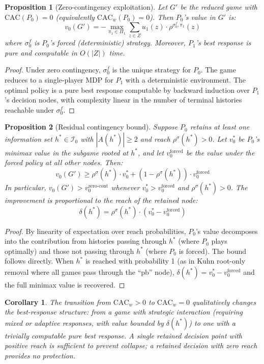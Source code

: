 \documentclass{article}
\newtheorem{proposition}{Proposition}
\newtheorem{corollary}{Corollary}
\begin{document}
\begin{proposition}[Zero-contingency exploitation]
\label{prop:zero}
Let $G'$ be the reduced game with $\text{CAC}(P_0) = 0$ (equivalently $\text{CAC}_w(P_0) = 0$). Then $P_0$'s value in $G'$ is:
\[
v_0(G') = -\max_{\pi_1 \in \Pi_1} \sum_{z \in Z} u_1(z) \cdot \rho^{\sigma_0^f, \pi_1}(z)
\]
where $\sigma_0^f$ is $P_0$'s forced (deterministic) strategy. Moreover, $P_1$'s best response is pure and computable in $O(|Z|)$ time.
\end{proposition}

\begin{proof}
Under zero contingency, $\sigma_0^f$ is the unique strategy for $P_0$. The game reduces to a single-player MDP for $P_1$ with a deterministic environment. The optimal policy is a pure best response computable by backward induction over $P_1$'s decision nodes, with complexity linear in the number of terminal histories reachable under $\sigma_0^f$.
\end{proof}

\begin{proposition}[Residual contingency bound]
\label{prop:residual}
Suppose $P_0$ retains at least one information set $h^* \in \mathcal{I}_0$ with $|A(h^*)| \geq 2$ and reach $\rho^{\sigma}(h^*) > 0$. Let $v_0^*$ be $P_0$'s minimax value in the subgame rooted at $h^*$, and let $v_0^{\text{forced}}$ be the value under the forced policy at all other nodes. Then:
\[
v_0(G') \geq \rho^{\sigma}(h^*) \cdot v_0^* + (1 - \rho^{\sigma}(h^*)) \cdot v_0^{\text{forced}}
\]
In particular, $v_0(G') > v_0^{\text{zero-cont}}$ whenever $v_0^* > v_0^{\text{forced}}$ and $\rho^{\sigma}(h^*) > 0$. The improvement is proportional to the reach of the retained node:
\[
\delta(h^*) = \rho^{\sigma}(h^*) \cdot (v_0^* - v_0^{\text{forced}})
\]
\end{proposition}

\begin{proof}
By linearity of expectation over reach probabilities, $P_0$'s value decomposes into the contribution from histories passing through $h^*$ (where $P_0$ plays optimally) and those not passing through $h^*$ (where $P_0$ is forced). The bound follows directly. When $h^*$ is reached with probability 1 (as in Kuhn root-only removal where all games pass through the ``pb'' node), $\delta(h^*) = v_0^* - v_0^{\text{forced}}$ and the full minimax value is recovered.
\end{proof}

\begin{corollary}
The transition from $\text{CAC}_w > 0$ to $\text{CAC}_w = 0$ qualitatively changes the best-response structure: from a game with strategic interaction (requiring mixed or adaptive responses, with value bounded by $\delta(h^*)$) to one with a trivially computable pure best response. A single retained decision point with positive reach is sufficient to prevent collapse; a retained decision with zero reach provides no protection.
\end{corollary}
\end{document}
